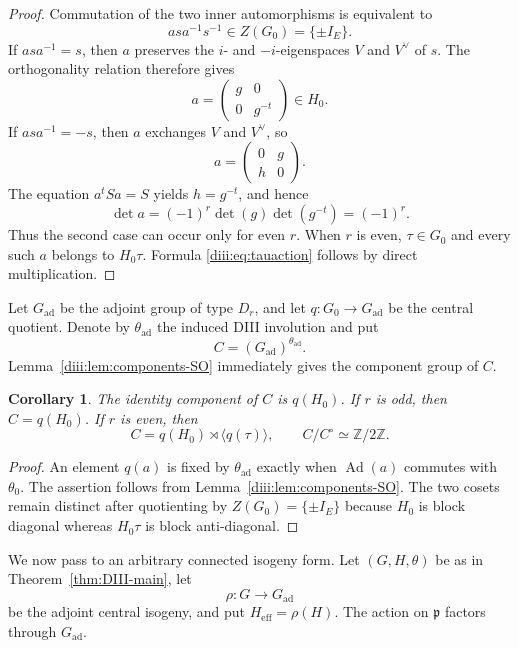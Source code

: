\documentclass[10pt,a4paper]{amsart}
\numberwithin{equation}{section}
\newtheorem{corollary}[theorem]{Corollary}
\newcommand{\Ad}{\operatorname{Ad}}
\newcommand{\fp}{\mathfrak p}
\begin{document}
\begin{proof}
Commutation of the two inner automorphisms is equivalent to
\[
  asa^{-1}s^{-1}\in Z(G_0)=\{\pm I_E\}.
\]
If $asa^{-1}=s$, then $a$ preserves the $i$- and $-i$-eigenspaces $V$ and
$V^\vee$ of $s$.  The orthogonality relation therefore gives
\[
  a=\begin{pmatrix}g&0\\0&g^{-t}\end{pmatrix}\in H_0.
\]
If $asa^{-1}=-s$, then $a$ exchanges $V$ and $V^\vee$, so
\[
  a=\begin{pmatrix}0&g\\h&0\end{pmatrix}.
\]
The equation $a^tSa=S$ yields $h=g^{-t}$, and hence
\[
  \det a=(-1)^r\det(g)\det(g^{-t})=(-1)^r.
\]
Thus the second case can occur only for even $r$.  When $r$ is even, $\tau\in G_0$ and every such $a$ belongs to $H_0\tau$.  Formula \eqref{diii:eq:tauaction} follows by direct multiplication.
\end{proof}

Let $G_{\mathrm{ad}}$ be the adjoint group of type $D_r$, and let
$q:G_0\to G_{\mathrm{ad}}$ be the central quotient.  Denote by
$\theta_{\mathrm{ad}}$ the induced DIII involution and put
\[
  C=(G_{\mathrm{ad}})^{\theta_{\mathrm{ad}}}.
\]
Lemma~\ref{diii:lem:components-SO} immediately gives the component group of $C$.

\begin{corollary}\label{diii:cor:Ccomponents}
The identity component of $C$ is $q(H_0)$.  If $r$ is odd, then
$C=q(H_0)$.  If $r$ is even, then
\[
  C=q(H_0)\rtimes\langle q(\tau)\rangle,
  \qquad C/C^\circ\simeq\mathbb Z/2\mathbb Z.
\]
\end{corollary}

\begin{proof}
An element $q(a)$ is fixed by $\theta_{\mathrm{ad}}$ exactly when
$\Ad(a)$ commutes with $\theta_0$.  The assertion follows from
Lemma~\ref{diii:lem:components-SO}.  The two cosets remain distinct after quotienting by $Z(G_0)=\{\pm I_E\}$ because $H_0$ is block diagonal whereas $H_0\tau$ is block anti-diagonal.
\end{proof}

We now pass to an arbitrary connected isogeny form.  Let $(G,H,\theta)$ be as in Theorem~\ref{thm:DIII-main}, let
\[
  \rho:G\longrightarrow G_{\mathrm{ad}}
\]
be the adjoint central isogeny, and put $H_{\mathrm{eff}}=\rho(H)$.  The action on $\fp$ factors through $G_{\mathrm{ad}}$.
\end{document}
